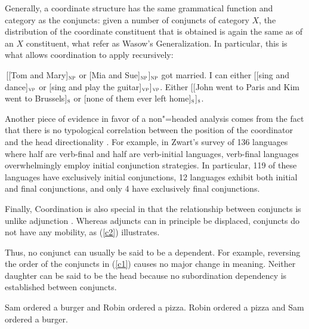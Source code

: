 \documentclass[output=paper]{langsci/langscibook}
\newcommand{\subl}[1]{$_{\small \textsc{#1}}$}
\begin{document}
Generally, a coordinate structure has the same grammatical function and category as the conjuncts: given a number of conjuncts of category $X$, the distribution of the coordinate constituent that is obtained is again the same as of an $X$ constituent, what \citet{pullumzwicky} refer as Wasow's Generalization.
In particular, this is what allows coordination to apply recursively:

\begin{exe}
\ex
\begin{xlista}
\ex \,[[Tom and Mary]\subl{np} or [Mia and Sue]\subl{np}]\subl{np} got married.
\ex I can either [[sing and dance]\subl{vp} or [sing and play the guitar]\subl{vp}]\subl{vp}.
\ex Either [[John went to Paris and Kim went to Brussels]\subl{s} or
[none of them ever left home]\subl{s}]\subl{s}.
\end{xlista}
\end{exe}

Another piece of evidence in favor of a non"=headed analysis comes from the fact that there is no typological correlation between the position of the coordinator and the head directionality \citep{zwart}. For example, in Zwart's  survey of 136 languages where half are verb-final and half
are verb-initial languages,  verb-final languages overwhelmingly employ initial conjunction strategies.
In particular, 119 of these languages have exclusively initial conjunctions, 12 languages exhibit both initial
and final conjunctions, and only 4 have exclusively final conjunctions. 


Finally, Coordination is also special in that the relationship between conjuncts is unlike adjunction \citep{levinepostal}.
Whereas adjuncts can in principle be displaced, conjuncts do not have any mobility, as (\ref{c2}) illustrates.

\begin{exe}
\ex
\begin{xlista}
\end{xlista}\label{c2}
\end{exe}


\noindent
Thus, no conjunct can usually be said to be a dependent. For example,  reversing the order of the conjuncts in (\ref{c1}) causes no major change in meaning. Neither daughter can be said to be the head because no subordination dependency is established between conjuncts.

\begin{exe}
\ex
\begin{xlista}
\ex Sam ordered a burger and Robin ordered a pizza.
\ex Robin ordered a pizza and Sam ordered a burger.
\end{xlista}\label{c1}
\end{exe}
\end{document}
